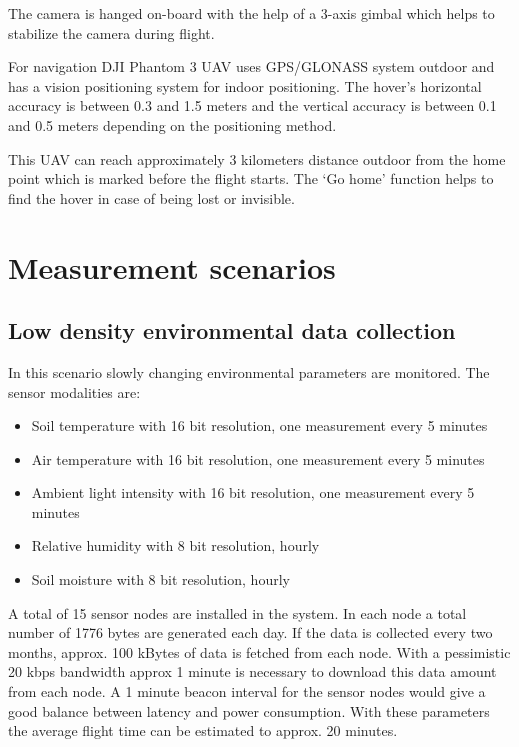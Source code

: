 \documentclass[conference]{IEEEtran}
\begin{document}
The camera is hanged on-board with the help of a 3-axis gimbal which helps to
stabilize the camera during flight. 

For navigation DJI Phantom 3 UAV uses GPS/GLONASS system outdoor and has a
vision positioning system for indoor positioning. The hover’s horizontal
accuracy is between 0.3 and 1.5 meters and the vertical accuracy is between 0.1
and 0.5 meters depending on the positioning method.

This UAV can reach approximately 3 kilometers distance outdoor from the home
point which is marked before the flight starts. The ‘Go home’ function helps to
find the hover in case of being lost or invisible.

\section{Measurement scenarios}

\subsection{Low density environmental data collection}

In this scenario slowly changing environmental parameters are monitored. The sensor modalities are:

\begin{itemize}

  \item{Soil temperature with 16 bit resolution, one measurement every 5 minutes}
  \item{Air temperature with 16 bit resolution, one measurement every 5 minutes}
  \item{Ambient light intensity with 16 bit resolution, one measurement every 5 minutes}
  \item{Relative humidity with 8 bit resolution, hourly}
  \item{Soil moisture with 8 bit resolution, hourly}

\end{itemize}

A total of 15 sensor nodes are installed in the system.
In each node a total number of 1776 bytes are generated each day.
If the data is collected every two months, approx.
100 kBytes of data is fetched from each node. With a
pessimistic 20 kbps bandwidth approx 1 minute is
necessary to download this data amount from each node.
A 1 minute beacon interval for the sensor nodes would
give a good balance between latency and power
consumption. With these parameters the average flight
time can be estimated to approx. 20 minutes.
\end{document}
